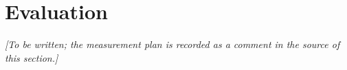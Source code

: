 \section{Evaluation}\label{sec:eval}

\emph{[To be written; the measurement plan is recorded as a comment in the
source of this section.]}

%
%
%
%
%
%
%
%
